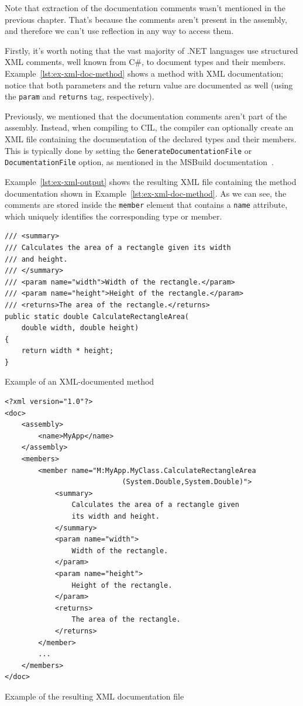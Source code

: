 Note that extraction of the documentation comments wasn't mentioned in the previous chapter.
That's because the comments aren't present in the assembly, and therefore we can't use reflection in any way to access them.

Firstly, it's worth noting that the vast majority of .NET languages use structured XML comments, well known from C\#, to document types and their members.
Example~\ref{lst:ex-xml-doc-method} shows a method with XML documentation; 
notice that both parameters and the return value are documented as well (using the \texttt{param} and \texttt{returns} tag, respectively).

Previously, we mentioned that the documentation comments aren't part of the assembly.
Instead, when compiling to CIL, the compiler can optionally create an XML file containing the documentation of the declared types and their members.
This is typically done by setting the \texttt{GenerateDocumentationFile} or \texttt{DocumentationFile} 
option, as mentioned in the MSBuild documentation~\cite{msbuild_docs}.

Example~\ref{lst:ex-xml-output} shows the resulting XML file containing the method documentation shown in Example~\ref{lst:ex-xml-doc-method}.
As we can see, the comments are stored inside the \texttt{member} element that contains a \texttt{name} attribute, which uniquely identifies the corresponding type or member.

\begin{listing}
\begin{lstlisting}
/// <summary>
/// Calculates the area of a rectangle given its width
/// and height.
/// </summary>
/// <param name="width">Width of the rectangle.</param>
/// <param name="height">Height of the rectangle.</param>
/// <returns>The area of the rectangle.</returns>
public static double CalculateRectangleArea(
    double width, double height)
{
    return width * height;
}
\end{lstlisting}
\caption{Example of an XML-documented method}
\label{lst:ex-xml-doc-method}
\end{listing}

\begin{listing}
\begin{lstlisting}
<?xml version="1.0"?>
<doc>
    <assembly>
        <name>MyApp</name>
    </assembly>
    <members>
        <member name="M:MyApp.MyClass.CalculateRectangleArea
                            (System.Double,System.Double)">
            <summary>
                Calculates the area of a rectangle given 
                its width and height.
            </summary>
            <param name="width">
                Width of the rectangle.
            </param>
            <param name="height">
                Height of the rectangle.
            </param>
            <returns>
                The area of the rectangle.
            </returns>
        </member>
        ...
    </members>
</doc>
\end{lstlisting}
\caption{Example of the resulting XML documentation file}
\label{lst:ex-xml-output}
\end{listing}

